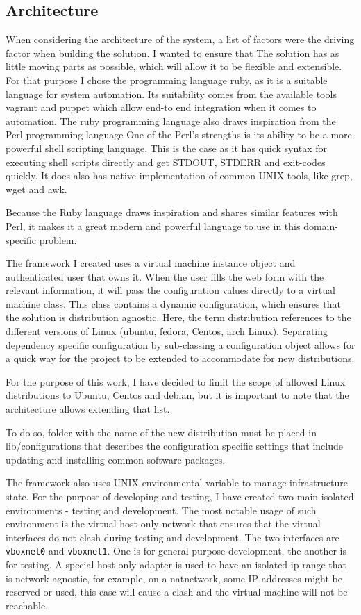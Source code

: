 \documentclass{article}
\begin{document}
\subsection{Architecture}
When considering the architecture of the system, a list of factors were the driving factor when building the solution. I wanted to ensure that The solution has as little moving parts as possible, which will allow it to be flexible and extensible. For that purpose I chose the programming language \gls{ruby}, as it is a suitable language for system automation. Its suitability comes from the available tools \gls{vagrant} and \gls{puppet} which allow end-to end integration when it comes to automation. The \gls{ruby} programming language also draws inspiration from the Perl programming language One of the Perl's strengths is its ability to be a more powerful shell scripting language. This is the case as it has quick syntax for executing shell scripts directly and get STDOUT, STDERR and exit-codes quickly. It does also has native implementation of common UNIX tools, like grep, wget and awk.

Because the Ruby language draws inspiration and shares similar features with Perl, it makes it a great modern and powerful language to use in this domain-specific problem.

The framework I created uses a virtual machine instance object and authenticated user that owns it. When the user fills the web form with the relevant information, it will pass the configuration values directly to a virtual machine class. This class contains a dynamic configuration, which ensures that the solution is distribution agnostic. Here, the term distribution references to the different versions of Linux (ubuntu, fedora, Centos, arch Linux). Separating dependency specific configuration by sub-classing a configuration object allows for a quick way for the project to be extended to accommodate for new distributions.

For the purpose of this work, I have decided to limit the scope of allowed Linux distributions to Ubuntu, Centos and debian, but it is important to note that the architecture allows extending that list.

To do so, folder with the name of the new distribution must be placed in lib/configurations that describes the configuration specific settings that include updating and installing common software packages.

The framework also uses UNIX environmental variable to manage infrastructure state. For the  purpose of developing and testing, I have created two main isolated environments - testing and development.
The most notable usage of such environment is the virtual host-only network that ensures that the virtual interfaces do not clash during testing and development. The two interfaces are \texttt{vboxnet0} and \texttt{vboxnet1}. One is for general purpose development, the another is for testing. A special host-only adapter is used to have an isolated ip range that is network agnostic, for example, on a \gls{natnetwork}, some IP addresses might be reserved or used, this case will cause a clash and the virtual machine will not be reachable.
\end{document}
